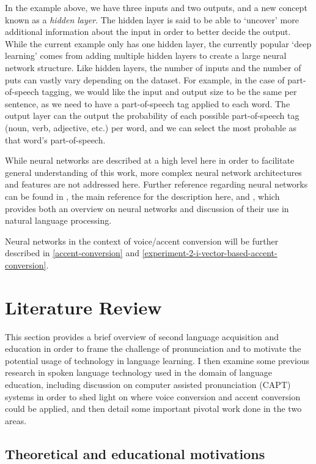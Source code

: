 \documentclass
[
    a4paper,
    twoside,
    12pt,
]
{report}
\begin{document}
In the example above, we have three inputs and two outputs, and a new
concept known as a \emph{hidden layer}. The hidden layer is said to be
able to `uncover' more additional information about the input in order
to better decide the output. While the current example only has one
hidden layer, the currently popular `deep learning' comes from adding
multiple hidden layers to create a large neural network structure. Like
hidden layers, the number of inputs and the number of puts can vastly
vary depending on the dataset. For example, in the case of
part-of-speech tagging, we would like the input and output size to be
the same per sentence, as we need to have a part-of-speech tag applied
to each word. The output layer can the output the probability of each
possible part-of-speech tag (noun, verb, adjective, etc.) per word, and
we can select the most probable as that word's part-of-speech.

While neural networks are described at a high level here in order to
facilitate general understanding of this work, more complex neural
network architectures and features are not addressed here. Further
reference regarding neural networks can be found in
\textcite{nielsen2015}, the main reference for the description here, and
\textcite{goldberg2017}, which provides both an overview on neural
networks and discussion of their use in natural language processing.

Neural networks in the context of voice/accent conversion will be
further described in \autoref{accent-conversion} and
\autoref{experiment-2-i-vector-based-accent-conversion}.
\chapter{Literature Review}

This section provides a brief overview of second language acquisition
and education in order to frame the challenge of pronunciation and to
motivate the potential usage of technology in language learning. I then
examine some previous research in spoken language technology used in the
domain of language education, including discussion on computer assisted
pronunciation (CAPT) systems in order to shed light on where voice
conversion and accent conversion could be applied, and then detail some
important pivotal work done in the two areas.

\hypertarget{theoretical-and-educational-motivations}{%
\section{Theoretical and educational
motivations}\label{theoretical-and-educational-motivations}}
\end{document}
